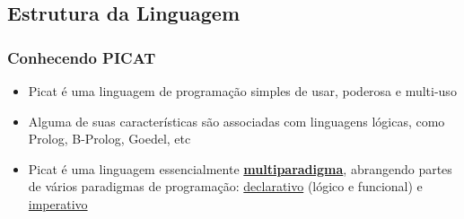 
\subsection{Estrutura da Linguagem}

\begin{frame}
	\frametitle{Conhecendo PICAT}
    
    \begin{itemize}
    
    	\item Picat é uma linguagem de programação simples de usar, poderosa e multi-uso
        
        \item Alguma de suas características 
         são associadas com linguagens lógicas, como Prolog, B-Prolog, Goedel, etc
        
        \pause
        \item Picat é uma linguagem essencialmente \underline{\textbf{multiparadigma}},
        abrangendo partes de vários paradigmas de programação: \underline{declarativo} (lógico e funcional) e    \underline{ imperativo}
        
        
    \end{itemize}
    
\end{frame}


